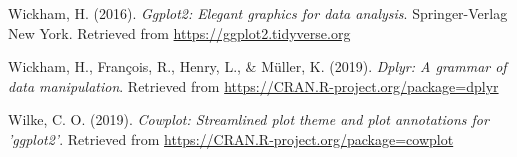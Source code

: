 \documentclass[english,,man,floatsintext]{apa6}
\begin{document}
\leavevmode\hypertarget{ref-r_wickham_ggplot2_2016}{}%
Wickham, H. (2016). \emph{Ggplot2: Elegant graphics for data analysis}. Springer-Verlag New York. Retrieved from \url{https://ggplot2.tidyverse.org}

\leavevmode\hypertarget{ref-r_wickham_dplyr_2019}{}%
Wickham, H., François, R., Henry, L., \& Müller, K. (2019). \emph{Dplyr: A grammar of data manipulation}. Retrieved from \url{https://CRAN.R-project.org/package=dplyr}

\leavevmode\hypertarget{ref-r_cowplot_2019}{}%
Wilke, C. O. (2019). \emph{Cowplot: Streamlined plot theme and plot annotations for 'ggplot2'}. Retrieved from \url{https://CRAN.R-project.org/package=cowplot}

\endgroup

\clearpage
\makeatletter
\efloat@restorefloats
\makeatother
\end{document}
